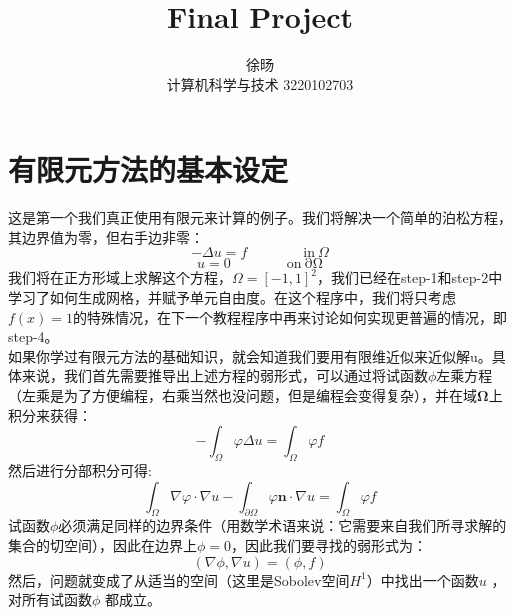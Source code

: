 \documentclass[nofonts]{ctexart} %
\title{Final Project}
\author{徐旸 \\ 计算机科学与技术 3220102703}
\begin{document}
\maketitle

\section{有限元方法的基本设定}
这是第一个我们真正使用有限元来计算的例子。我们将解决一个简单的泊松方程，其边界值为零，但右手边非零：
\begin{equation}
 -\Delta u=f\quad\quad\quad\quad\mathrm{in~}\Omega
\end{equation}
\begin{equation}
 u=0\quad\quad\quad\quad\mathrm{on~\partial\Omega}
\end{equation}
我们将在正方形域上求解这个方程，$\Omega=[-1,1]^2$，我们已经在step-1和step-2中学习了如何生成网格，并赋予单元自由度。在这个程序中，我们将只考虑$f(x)=1$的特殊情况，在下一个教程程序中再来讨论如何实现更普遍的情况，即step-4。\\
如果你学过有限元方法的基础知识，就会知道我们要用有限维近似来近似解u。具体来说，我们首先需要推导出上述方程的弱形式，可以通过将试函数$\phi$左乘方程（左乘是为了方便编程，右乘当然也没问题，但是编程会变得复杂），并在域$\boldsymbol{\Omega}$上积分来获得：
\begin{equation}
-\int_\Omega\varphi\Delta u=\int_\Omega\varphi f
\end{equation}
然后进行分部积分可得:
\begin{equation}
\int_{\Omega}\nabla\varphi\cdot\nabla u-\int_{\partial\Omega}\varphi\mathbf{n}\cdot\nabla u=\int_{\Omega}\varphi f
\end{equation}
试函数$\phi$必须满足同样的边界条件（用数学术语来说：它需要来自我们所寻求解的集合的切空间），因此在边界上$\phi=0$，因此我们要寻找的弱形式为：
\begin{equation}
(\nabla\phi,\nabla u)=(\phi,f)
\end{equation}
然后，问题就变成了从适当的空间（这里是Sobolev空间$H^{1}$）中找出一个函数$u$
，对所有试函数$\phi$
都成立。\\
\end{document}
